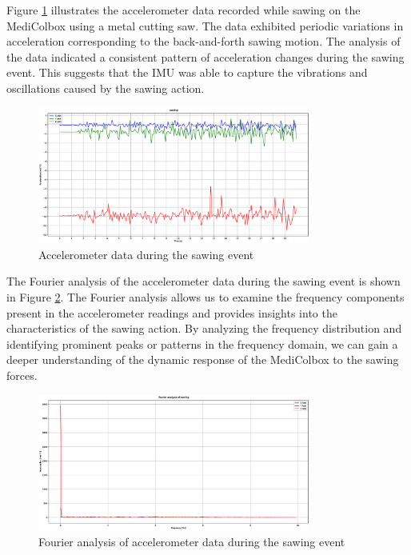 \documentclass[../main.tex]{subfiles}
\begin{document}
Figure \ref{fig:accelerometer_sawing} illustrates the
accelerometer data recorded while sawing on the
MediColbox using a metal cutting saw.
The data exhibited periodic variations in acceleration
corresponding to the back-and-forth sawing motion.
The analysis of the data indicated a consistent pattern of
acceleration changes during the sawing event. This suggests that the IMU was able to capture the vibrations and oscillations caused by the sawing action.

\begin{figure}[htbp]
    \centering
    \includegraphics[width=0.8\textwidth]{resources/figures/Acceleration_sawing.eps}
    \caption{Accelerometer data during the sawing event}
    \label{fig:accelerometer_sawing}
\end{figure}

The Fourier analysis of the accelerometer data during the sawing event is shown in Figure \ref{fig:fourier_accelerometer_sawing}. The Fourier analysis allows us to examine the frequency components present in the accelerometer readings and provides insights into the characteristics of the sawing action. By analyzing the frequency distribution and identifying prominent peaks or patterns in the frequency domain, we can gain a deeper understanding of the dynamic response of the MediColbox to the sawing forces.

\begin{figure}[htbp]
    \centering
    \includegraphics[width=0.8\textwidth]{resources/figures/Fourier_acceleration_sawing.eps}
    \caption{Fourier analysis of accelerometer data during the sawing event}
    \label{fig:fourier_accelerometer_sawing}
\end{figure}
\end{document}
